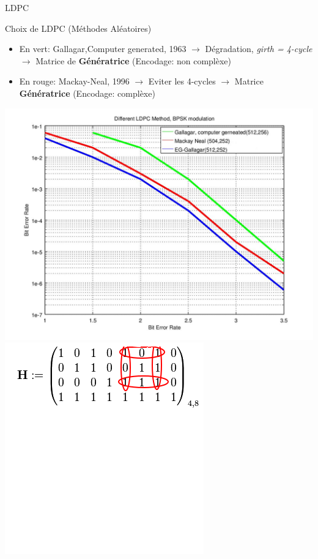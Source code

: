 \documentclass[8pt]{beamer}
\newcommand{\1}{\mathbbm 1}
\begin{document}
\begin{frame}{LDPC}

\begin{block}{Choix de LDPC (Méthodes Aléatoires)}

\begin{itemize}
\item En vert: Gallagar,Computer generated, 1963 $\rightarrow$ Dégradation, \textit{girth = 4-cycle} $\rightarrow$  Matrice de \textbf{Génératrice} (Encodage: non complèxe)
 
 
\item En rouge: Mackay-Neal, 1996 \cite{errorcontrolcoding}$\rightarrow$ Eviter les 4-cycles $\rightarrow$ Matrice \textbf{Génératrice} (Encodage: complèxe)
\end{itemize}

\end{block}

\begin{center}
\includegraphics[scale=0.35]{figures/ber_ldpc.jpg}
\includegraphics[scale=0.4]{figures/H.png}

\end{center}
\end{frame}
\end{document}
